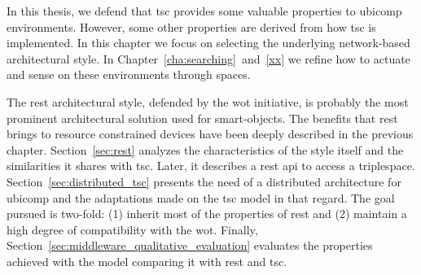 In this thesis, we defend that \acf{tsc} provides some valuable properties to \ac{ubicomp} environments. %
However, some other properties are derived from how \ac{tsc} is implemented.
In this chapter we focus on selecting the underlying network-based architectural style.
In Chapter~\ref{cha:searching}~and~\ref{xx} we refine how to actuate and sense on these environments through spaces.


The \ac{rest} architectural style, defended by the \acf{wot} initiative, is probably the most prominent architectural solution used for smart-objects. %
The benefits that \ac{rest} brings to resource constrained devices have been deeply described in the previous chapter.
Section~\ref{sec:rest} analyzes the characteristics of the style itself and the similarities it shares with \ac{tsc}.
Later, it describes a \ac{rest} \ac{api} to access a triplespace. %
Section~\ref{sec:distributed_tsc} presents the need of a distributed architecture for \ac{ubicomp} and the adaptations made on the \ac{tsc} model in that regard.
The goal pursued is two-fold: (1) inherit most of the properties of \ac{rest} and (2) maintain a high degree of compatibility with the \ac{wot}.
Finally, Section~\ref{sec:middleware_qualitative_evaluation} evaluates the properties achieved with the model comparing it with \ac{rest} and \ac{tsc}.








%
%
%